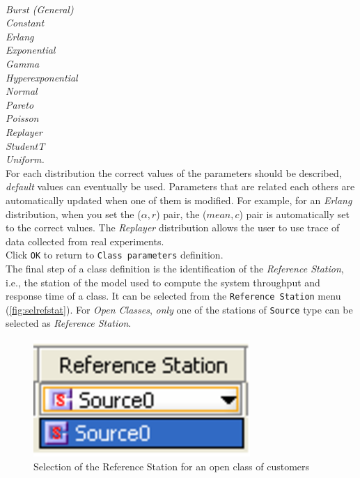 \\
\emph{Burst (General)\\
Constant\\
Erlang\\
Exponential\\
Gamma\\
Hyperexponential\\
Normal\\
Pareto\\
Poisson\\
Replayer\\
StudentT\\
Uniform.\\
} For each distribution the correct values of the
parameters should be described, \emph{default} values can eventually be
used. Parameters that are related each others are automatically
updated when one of them is modified. For example, for an
\emph{Erlang} distribution, when you set the ($\alpha, r$) pair, the
($mean, c$) pair is automatically set to the correct values. The
\emph{Replayer} distribution
allows the user to use trace of data collected from real experiments.\\
Click \texttt{OK} to return to \texttt{Class parameters} definition.\\
The final step of a class definition is the identification of the
\emph{Reference Station}, i.e., the station of the model used to
compute the system throughput and response time of a class. It can be
selected from
the \texttt{Reference
Station} menu (\autoref{fig:selrefstat}). For
\emph{Open Classes}, \emph{only} one of the stations of
\texttt{Source} type can be selected as \emph{Reference Station}.
\begin{figure}[htb!]
    \begin{center}
        \includegraphics[scale=.5]{img/jsimg/3.6.eps}
    \end{center}
    \caption{Selection of the Reference Station for an open class of customers}
    \label{fig:selrefstat}
\end{figure}\\

